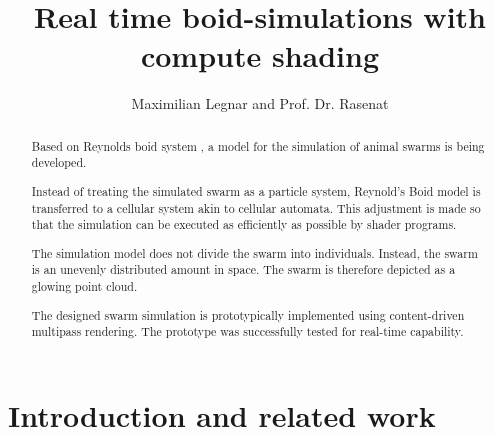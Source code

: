 \documentclass[a4paper, 10pt, journal]{wissarbIEEE}      %
\title{\LARGE \bf
Real time boid-simulations with compute shading
}
\author{Maximilian Legnar and Prof. Dr. Rasenat}%
\begin{document}
\maketitle

\begin{abstract}

%
%
%

Based on Reynolds boid system \cite{Reynolds87flocks}, a model for the simulation of animal swarms is being developed. 

Instead of treating the simulated swarm as a particle system, Reynold's Boid model is transferred to a cellular system akin to cellular automata. This adjustment is made so that the simulation can be executed as efficiently as possible by shader programs. 

The simulation model does not divide the swarm into individuals. Instead, the swarm is an unevenly distributed amount in space. The swarm is therefore depicted as a glowing point cloud. 

The designed swarm simulation is prototypically implemented using content-driven multipass rendering. The prototype was successfully tested for real-time capability.


\end{abstract}

\section{Introduction and related work}
\end{document}
